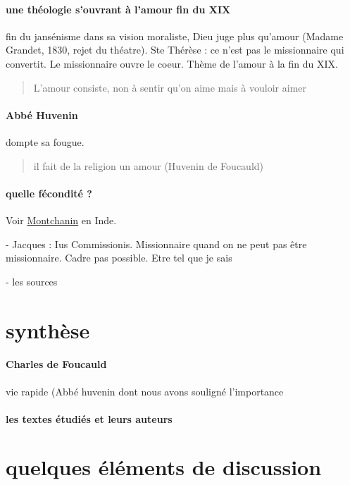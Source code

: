 \paragraph{une théologie s'ouvrant à l'amour fin du XIX} fin du jansénisme dans sa vision moraliste, Dieu juge plus qu'amour (Madame Grandet, 1830, rejet du théatre). 
Ste Thérèse : ce n'est pas le missionnaire qui convertit. Le missionnaire ouvre le coeur. 
Thème de l'amour à la fin du XIX. 
\begin{quote}
    L'amour consiste, non à sentir qu'on aime mais à vouloir aimer 
\end{quote}


\paragraph{Abbé Huvenin} dompte sa fougue. 
\begin{quote}
    il fait de la religion un amour (Huvenin de Foucauld)
\end{quote}

\paragraph{quelle fécondité ?} Voir  \href{https://fr.wikipedia.org/wiki/Jules_Monchanin}{Montchanin} en Inde.



- Jacques : Ius Commissionis.  Missionnaire quand on ne peut pas être missionnaire. Cadre pas possible. Etre tel que je sais

- les sources

\section{synthèse}

\paragraph{Charles de Foucauld}
vie rapide (Abbé huvenin dont nous avons souligné l'importance


\paragraph{les textes étudiés et leurs auteurs}

\section{quelques éléments de discussion}

